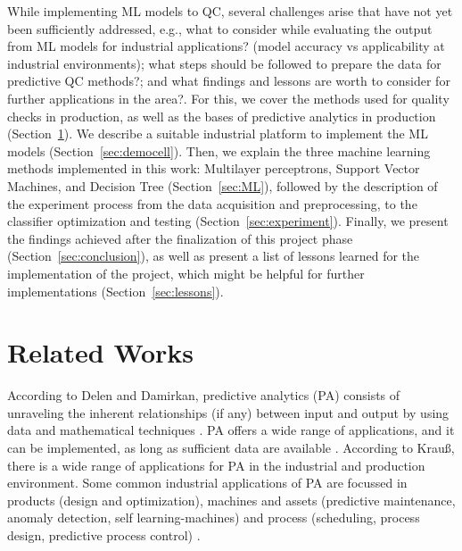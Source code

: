 \documentclass[5p,times,procedia]{elsarticle}
\begin{document}
While implementing ML models to QC, several challenges arise that have not yet been sufficiently addressed, e.g., what to consider while evaluating the output from ML models for industrial applications? (model accuracy vs applicability at industrial environments); what steps should be followed to prepare the data for predictive QC methods?; and what findings and lessons are worth to consider for further applications in the area?. 
For this, we cover the methods used for quality checks in production, as well as the bases of predictive analytics in production (Section~\ref{sec:related_works}). 
We describe a suitable industrial platform to implement the ML models (Section~\ref{sec:democell}).
Then, we explain the three machine learning methods implemented in this work: Multilayer perceptrons, Support Vector Machines, and Decision Tree (Section~\ref{sec:ML}), followed by the description of the experiment process from the data acquisition and preprocessing, to the classifier optimization and testing (Section~\ref{sec:experiment}).
Finally, we present the findings achieved after the finalization of this project phase (Section~\ref{sec:conclusion}), as well as present a list of lessons learned for the implementation of the project, which might be helpful for further implementations (Section~\ref{sec:lessons}).

\section{Related Works} \label{sec:related_works}%

According to Delen and Damirkan, predictive analytics (PA) consists of unraveling the inherent relationships (if any) between input and output by using data and mathematical techniques \cite{delen2013data}.
PA offers a wide range of applications, and it can be implemented, as long as sufficient data are available \cite{bishop2006pattern}.
According to Krauß, there is a wide range of applications for PA in the industrial and production environment. 
Some common industrial applications of PA are focussed in products (design and optimization), machines and assets (predictive maintenance, anomaly detection, self learning-machines) and process (scheduling, process design, predictive process control) \cite{krauss2019machine}.
\end{document}
